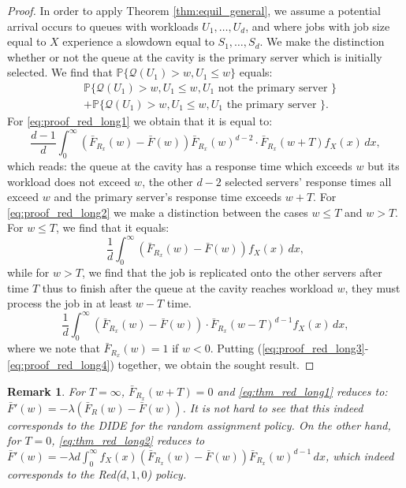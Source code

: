 \documentclass[12pt]{report}
\renewcommand{\P}{\mathbb{P}}
\newcommand{\QQ}{\mathcal{Q}}
\renewcommand{\P}{\mathbb{P}}
\newtheorem{remark}{Remark}
\begin{document}
\begin{proof}
In order to apply Theorem \ref{thm:equil_general}, we assume a potential arrival occurs to queues with workloads $U_1,\dots,U_d$, and where jobs with job size equal to $X$ experience a slowdown equal to $S_1,\dots, S_d$. We make the distinction whether or not the queue at the cavity is the primary server which is initially selected. We find that $\P\{
\QQ(U_1)> w, U_1\leq w
\}$ equals:
\begin{align}
&\P\{
\QQ(U_1)> w, U_1\leq w, U_1 \mbox{ not the primary server }
\} \label{eq:proof_red_long1}\\
&+\P\{
\QQ(U_1)> w, U_1\leq w, U_1 \mbox{ the primary server }
\}. \label{eq:proof_red_long2}
\end{align}
For \eqref{eq:proof_red_long1} we obtain that it is equal to:
\begin{equation}
\frac{d-1}{d} \int_0^\infty (\bar F_{R_x}(w)-\bar F(w)) \bar F_{R_x}(w)^{d-2} \cdot \bar F_{R_x}(w+T) f_X(x)\, dx,\label{eq:proof_red_long3}
\end{equation}
which reads: the queue at the cavity has a response time which exceeds $w$ but its workload does not exceed $w$, the other $d-2$ selected servers' response times all exceed $w$ and the primary server's response time exceeds $w+T$.
For \eqref{eq:proof_red_long2} we make a distinction between the cases $w\leq T$ and $w>T$. For $w\leq T$, we find that it equals:
\begin{equation}
\frac{1}{d} \int_0^\infty (\bar F_{R_x}(w)-\bar F(w)) f_X(x)\, dx,
\end{equation}
while for $w>T$, we find that the job is replicated onto the other servers after time $T$ thus to finish after the queue at the cavity reaches workload $w$, they must process the job in at least $w-T$ time.
\begin{equation}
\frac{1}{d} \int_0^\infty (\bar F_{R_x}(w) - \bar F(w)) \cdot \bar F_{R_x}(w-T)^{d-1} f_X(x)\, dx,\label{eq:proof_red_long4}
\end{equation}
where we note that $\bar F_{R_x}(w) = 1$ if $w<0$. Putting (\ref{eq:proof_red_long3}-\ref{eq:proof_red_long4}) together, we obtain the sought result.
\end{proof}
\begin{remark}
For $T=\infty$, $\bar F_{R_x}(w+T)=0$ and \eqref{eq:thm_red_long1} reduces to: $\bar F'(w) = -\lambda (\bar F_R(w) - \bar F(w))$. It is not hard to see that this indeed corresponds to the DIDE for the random assignment policy. On the other hand, for $T=0$, \eqref{eq:thm_red_long2} reduces to $\bar F'(w) = -\lambda d \int_0^\infty f_X(x) (\bar F_{R_x}(w) - \bar F(w)) \bar F_{R_x}(w)^{d-1}\, dx$, which indeed corresponds to the Red($d,1,0$) policy.
\end{remark}
\end{document}
